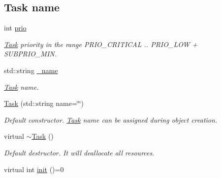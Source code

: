 \subsection*{Task name}
\begin{DoxyCompactItemize}
\item 
\hypertarget{class_task_a00e8e39305d63fc2e6b65dba7b18e9fe}{int \hyperlink{class_task_a00e8e39305d63fc2e6b65dba7b18e9fe}{prio}}\label{class_task_a00e8e39305d63fc2e6b65dba7b18e9fe}

\begin{DoxyCompactList}\small\item\em \hyperlink{class_task}{Task} priority in the range P\-R\-I\-O\-\_\-\-C\-R\-I\-T\-I\-C\-A\-L .. P\-R\-I\-O\-\_\-\-L\-O\-W + S\-U\-B\-P\-R\-I\-O\-\_\-\-M\-I\-N. \end{DoxyCompactList}\item 
\hypertarget{class_task_a28ec34b5b8eb76b4a76172f11b93af53}{std\-::string \hyperlink{class_task_a28ec34b5b8eb76b4a76172f11b93af53}{\-\_\-name}}\label{class_task_a28ec34b5b8eb76b4a76172f11b93af53}

\begin{DoxyCompactList}\small\item\em \hyperlink{class_task}{Task} name. \end{DoxyCompactList}\item 
\hypertarget{class_task_a27a2c8bccb379a632c2a2369cbfa2224}{\hyperlink{class_task_a27a2c8bccb379a632c2a2369cbfa2224}{Task} (std\-::string name=\char`\"{}\char`\"{})}\label{class_task_a27a2c8bccb379a632c2a2369cbfa2224}

\begin{DoxyCompactList}\small\item\em Default constructor. \hyperlink{class_task}{Task} name can be assigned during object creation. \end{DoxyCompactList}\item 
\hypertarget{class_task_a3ecf499ea35fb4a96853969a1e1cbbce}{virtual \hyperlink{class_task_a3ecf499ea35fb4a96853969a1e1cbbce}{$\sim$\-Task} ()}\label{class_task_a3ecf499ea35fb4a96853969a1e1cbbce}

\begin{DoxyCompactList}\small\item\em Default destructor. It will deallocate all resources. \end{DoxyCompactList}\item 
\hypertarget{class_task_aa7aeb450a822c8e4b53d2d6654073fcc}{virtual int \hyperlink{class_task_aa7aeb450a822c8e4b53d2d6654073fcc}{init} ()=0}\label{class_task_aa7aeb450a822c8e4b53d2d6654073fcc}


\end{DoxyCompactItemize}
